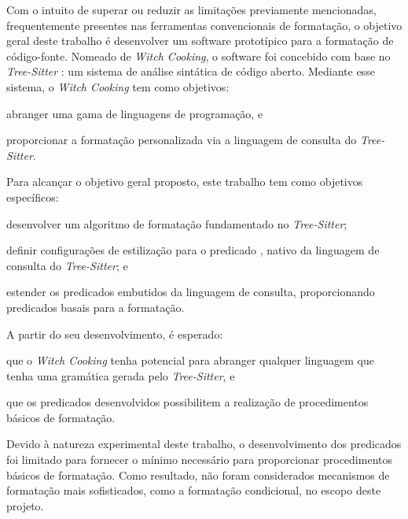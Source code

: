 \documentclass
  [11pt,a4paper,english,brazil,openright,sumario=tradicional,twoside]
  {abntex2}
\newcommand{\treesitter}{\textit{Tree-Sitter}\xspace}
\newcommand{\witchcooking}{\textit{Witch Cooking}\xspace}
\begin{document}
  Com o intuito de superar ou reduzir as limitações previamente mencionadas,
  frequentemente presentes nas ferramentas convencionais de formatação, o
  objetivo geral deste trabalho é desenvolver um software prototípico para a
  formatação de código-fonte. Nomeado de \witchcooking \cite{silva-2023-witch},
  o software foi concebido com base no \treesitter
  \cite{tree-sitter-2023-tree}: um sistema de análise sintática de código
  aberto. Mediante esse sistema, o \witchcooking tem como objetivos:
  \begin{inparaenum}
    \item abranger uma gama de linguagens de programação, e
    \item proporcionar a formatação personalizada via a linguagem de consulta
          do \treesitter.
  \end{inparaenum}

  Para alcançar o objetivo geral proposto, este trabalho tem como objetivos
  específicos:
  \begin{inparaenum}
    \item desenvolver um algoritmo de formatação fundamentado no \treesitter;
    \item definir configurações de estilização para o predicado
          , nativo da linguagem de consulta do
          \treesitter; e
    \item estender os predicados embutidos da linguagem de consulta,
          proporcionando predicados basais para a formatação.
  \end{inparaenum}

  A partir do seu desenvolvimento, é esperado:
  \begin{inparaenum}
    \item que o \witchcooking tenha potencial para abranger qualquer linguagem
          que tenha uma gramática gerada pelo \treesitter, e
    \item que os predicados desenvolvidos possibilitem a realização de
          procedimentos básicos de formatação.
  \end{inparaenum}

  Devido à natureza experimental deste trabalho, o desenvolvimento dos
  predicados foi limitado para fornecer o mínimo necessário para proporcionar
  procedimentos básicos de formatação. Como resultado, não foram considerados
  mecanismos de formatação mais sofisticados, como a formatação condicional, no
  escopo deste projeto.

\end{document}
